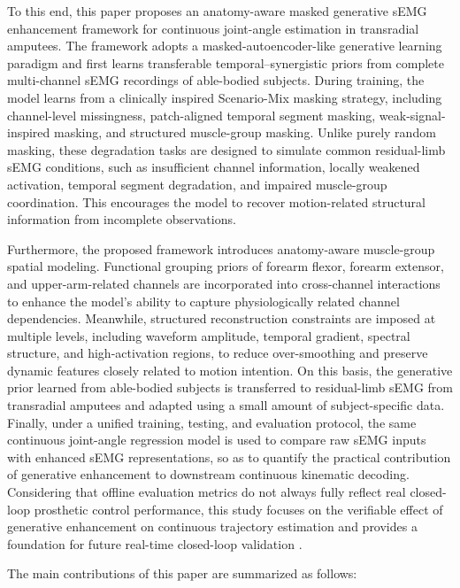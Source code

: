 \documentclass[journal]{IEEEtran}
\begin{document}
To this end, this paper proposes an anatomy-aware masked generative sEMG enhancement framework for continuous joint-angle estimation in transradial amputees. The framework adopts a masked-autoencoder-like generative learning paradigm \cite{He2022MAE} and first learns transferable temporal--synergistic priors from complete multi-channel sEMG recordings of able-bodied subjects. During training, the model learns from a clinically inspired Scenario-Mix masking strategy, including channel-level missingness, patch-aligned temporal segment masking, weak-signal-inspired masking, and structured muscle-group masking. Unlike purely random masking, these degradation tasks are designed to simulate common residual-limb sEMG conditions, such as insufficient channel information, locally weakened activation, temporal segment degradation, and impaired muscle-group coordination. This encourages the model to recover motion-related structural information from incomplete observations.

Furthermore, the proposed framework introduces anatomy-aware muscle-group spatial modeling. Functional grouping priors of forearm flexor, forearm extensor, and upper-arm-related channels are incorporated into cross-channel interactions to enhance the model's ability to capture physiologically related channel dependencies. Meanwhile, structured reconstruction constraints are imposed at multiple levels, including waveform amplitude, temporal gradient, spectral structure, and high-activation regions, to reduce over-smoothing and preserve dynamic features closely related to motion intention. On this basis, the generative prior learned from able-bodied subjects is transferred to residual-limb sEMG from transradial amputees and adapted using a small amount of subject-specific data. Finally, under a unified training, testing, and evaluation protocol, the same continuous joint-angle regression model is used to compare raw sEMG inputs with enhanced sEMG representations, so as to quantify the practical contribution of generative enhancement to downstream continuous kinematic decoding. Considering that offline evaluation metrics do not always fully reflect real closed-loop prosthetic control performance, this study focuses on the verifiable effect of generative enhancement on continuous trajectory estimation and provides a foundation for future real-time closed-loop validation \cite{OrtizCatalan2015Offline,Vujaklija2017Translating}.

The main contributions of this paper are summarized as follows:
\end{document}
